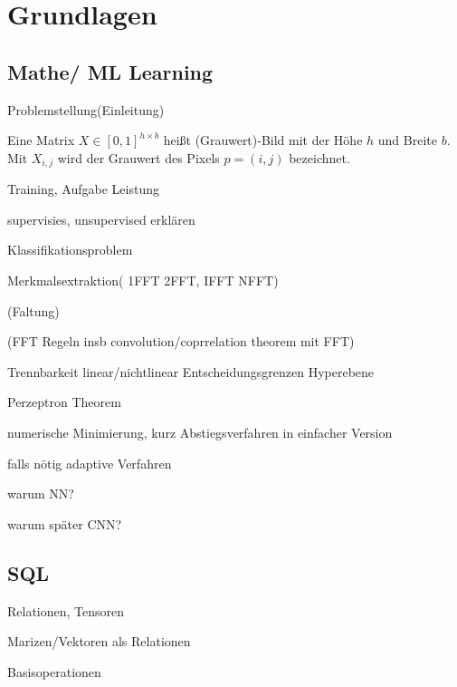 \chapter{Grundlagen}

\section*{Mathe/ ML Learning}
Problemstellung(Einleitung)

\begin{defi}
    \label{def:image}
    Eine Matrix $X \in [0,1]^{h \times b}$ heißt (Grauwert)-Bild mit der Höhe $h$ und Breite $b$. Mit $X_{i,j}$ wird der Grauwert des Pixels $p=(i,j)$ bezeichnet.
\end{defi}


Training, Aufgabe Leistung

supervisies, unsupervised erklären

Klassifikationsproblem

Merkmalsextraktion( 1FFT 2FFT, IFFT NFFT)

(Faltung)

(FFT Regeln insb convolution/coprrelation theorem mit FFT)

Trennbarkeit linear/nichtlinear Entscheidungsgrenzen Hyperebene

Perzeptron Theorem

numerische Minimierung, kurz Abstiegsverfahren in einfacher Version

falls nötig adaptive Verfahren

warum NN?

warum später CNN?


\section*{SQL}
Relationen, Tensoren

Marizen/Vektoren als Relationen

Basisoperationen

